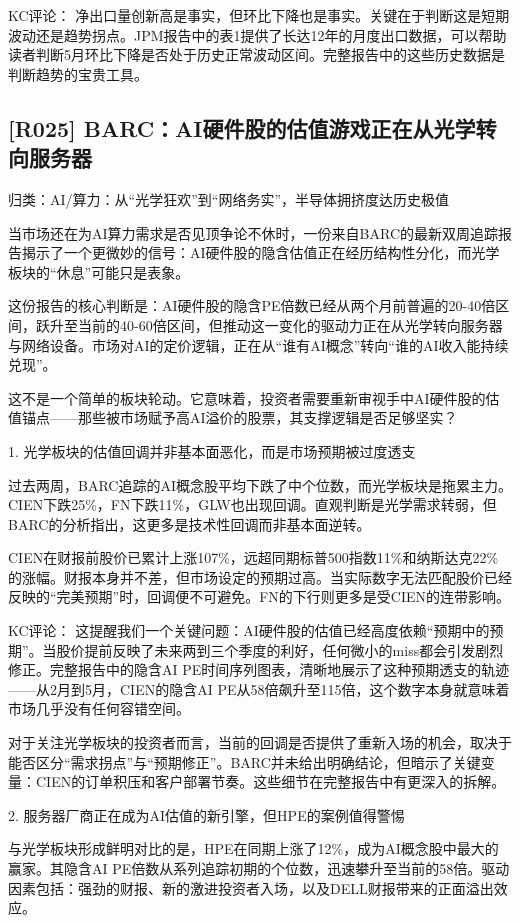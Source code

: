 \documentclass[11pt]{ctexart}
\begin{document}
KC评论： 净出口量创新高是事实，但环比下降也是事实。关键在于判断这是短期波动还是趋势拐点。JPM报告中的表1提供了长达12年的月度出口数据，可以帮助读者判断5月环比下降是否处于历史正常波动区间。完整报告中的这些历史数据是判断趋势的宝贵工具。

\subsection{[R025] BARC：AI硬件股的估值游戏正在从光学转向服务器}
{\small\color{refgray}归类：AI/算力：从“光学狂欢”到“网络务实”，半导体拥挤度达历史极值}

当市场还在为AI算力需求是否见顶争论不休时，一份来自BARC的最新双周追踪报告揭示了一个更微妙的信号：AI硬件股的隐含估值正在经历结构性分化，而光学板块的“休息”可能只是表象。

这份报告的核心判断是：AI硬件股的隐含PE倍数已经从两个月前普遍的20-40倍区间，跃升至当前的40-60倍区间，但推动这一变化的驱动力正在从光学转向服务器与网络设备。市场对AI的定价逻辑，正在从“谁有AI概念”转向“谁的AI收入能持续兑现”。

这不是一个简单的板块轮动。它意味着，投资者需要重新审视手中AI硬件股的估值锚点——那些被市场赋予高AI溢价的股票，其支撑逻辑是否足够坚实？

1. 光学板块的估值回调并非基本面恶化，而是市场预期被过度透支

过去两周，BARC追踪的AI概念股平均下跌了中个位数，而光学板块是拖累主力。CIEN下跌25\%，FN下跌11\%，GLW也出现回调。直观判断是光学需求转弱，但BARC的分析指出，这更多是技术性回调而非基本面逆转。

CIEN在财报前股价已累计上涨107\%，远超同期标普500指数11\%和纳斯达克22\%的涨幅。财报本身并不差，但市场设定的预期过高。当实际数字无法匹配股价已经反映的“完美预期”时，回调便不可避免。FN的下行则更多是受CIEN的连带影响。

KC评论： 这提醒我们一个关键问题：AI硬件股的估值已经高度依赖“预期中的预期”。当股价提前反映了未来两到三个季度的利好，任何微小的miss都会引发剧烈修正。完整报告中的隐含AI PE时间序列图表，清晰地展示了这种预期透支的轨迹——从2月到5月，CIEN的隐含AI PE从58倍飙升至115倍，这个数字本身就意味着市场几乎没有任何容错空间。

对于关注光学板块的投资者而言，当前的回调是否提供了重新入场的机会，取决于能否区分“需求拐点”与“预期修正”。BARC并未给出明确结论，但暗示了关键变量：CIEN的订单积压和客户部署节奏。这些细节在完整报告中有更深入的拆解。

2. 服务器厂商正在成为AI估值的新引擎，但HPE的案例值得警惕

与光学板块形成鲜明对比的是，HPE在同期上涨了12\%，成为AI概念股中最大的赢家。其隐含AI PE倍数从系列追踪初期的个位数，迅速攀升至当前的58倍。驱动因素包括：强劲的财报、新的激进投资者入场，以及DELL财报带来的正面溢出效应。
\end{document}
